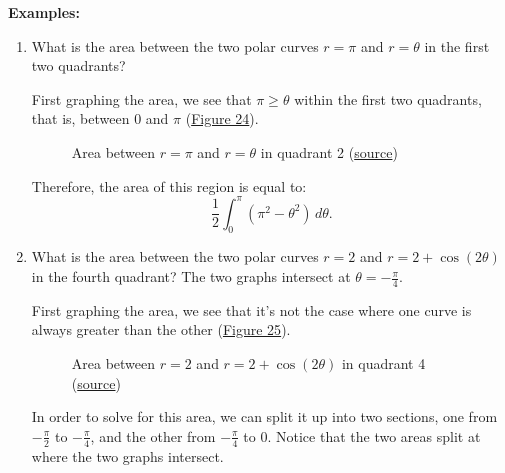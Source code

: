\documentclass[12pt]{article}
\begin{document}
\noindent \textbf{Examples:}
\begin{enumerate}
    \item What is the area between the two polar curves $r=\pi$ and $r=\theta$ in the first two quadrants?

          First graphing the area, we see that $\pi \ge \theta$ within the first two quadrants, that is, between $0$ and $\pi$ (\hyperref[fig:abpc1]{Figure 24}).

          \begin{figure}[H]
              \begin{center}
                  \caption{Area between $r=\pi$ and $r=\theta$ in quadrant 2 (\href{https://www.khanacademy.org/math/ap-calculus-bc/bc-advanced-functions-new/bc-9-9/e/area-between-two-polar-curves?modal=1}{source})}
                  \label{fig:abpc1}
              \end{center}
          \end{figure}

          Therefore, the area of this region is equal to:
          \[ \frac{1}{2} \int_0^\pi \left( \pi^2 - \theta^2 \right) \, d\theta. \]
          \bigskip

    \item What is the area between the two polar curves $r=2$ and $r=2+\cos(2\theta)$ in the fourth quadrant? The two graphs intersect at $\theta = -\frac{\pi}{4}$.

          First graphing the area, we see that it's not the case where one curve is always greater than the other (\hyperref[fig:abpc2]{Figure 25}).

          \begin{figure}[H]
              \begin{center}
                  \caption{Area between $r=2$ and $r=2+\cos(2\theta)$ in quadrant 4 (\href{https://www.khanacademy.org/math/ap-calculus-bc/bc-advanced-functions-new/bc-9-9/e/area-between-two-polar-curves?modal=1}{source})}
                  \label{fig:abpc2}
              \end{center}
          \end{figure}

          In order to solve for this area, we can split it up into two sections, one from $-\frac{\pi}{2}$ to $-\frac{\pi}{4}$, and the other from $-\frac{\pi}{4}$ to $0$. Notice that the two areas split at where the two graphs intersect.


\end{enumerate}
\end{document}
